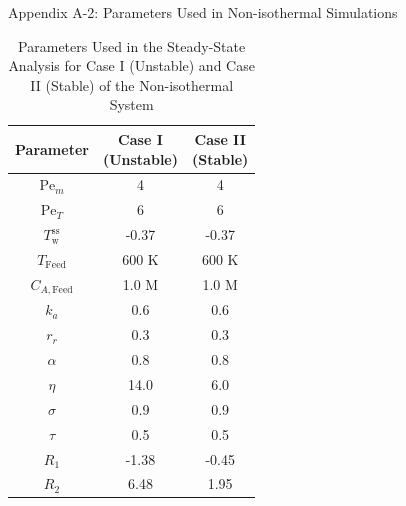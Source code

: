 \documentclass[8pt]{beamer}
\begin{document}
\begin{frame}{Appendix A-2: Parameters Used in Non-isothermal Simulations}
\begin{table}[ht]
    \centering
    \caption{Parameters Used in the Steady-State Analysis for Case I (Unstable) and Case II (Stable) of the Non-isothermal System} \label{tab:pars_2}
    \begin{tabular}{|c|c|c|}
    \hline
    \textbf{Parameter} & \makecell{\textbf{Case I} \\ \textbf{(Unstable)}} & \makecell{\textbf{Case II} \\ \textbf{(Stable)}} \\
    \hline
    $\mathrm{Pe}_m$  & 4        & 4      \\
    $\mathrm{Pe}_T$  & 6        & 6      \\
    $T_{\mathrm{w}}^{\mathrm{ss}}$ & -0.37 & -0.37  \\
    $T_{\mathrm{Feed}}$ & 600 K & 600 K  \\
    $C_{A, \mathrm{Feed}}$ & 1.0 M & 1.0 M  \\
    $k_a$            & 0.6      & 0.6    \\
    $r_r$            & 0.3      & 0.3    \\
    $\alpha$         & 0.8      & 0.8    \\
    $\eta$           & 14.0     & 6.0    \\
    $\sigma$         & 0.9      & 0.9    \\
    $\tau$           & 0.5      & 0.5    \\
    $R_1$            & -1.38    & -0.45  \\
    $R_2$            & 6.48     & 1.95   \\
    \hline
    \end{tabular}
\end{table}
\end{frame}
\end{document}
